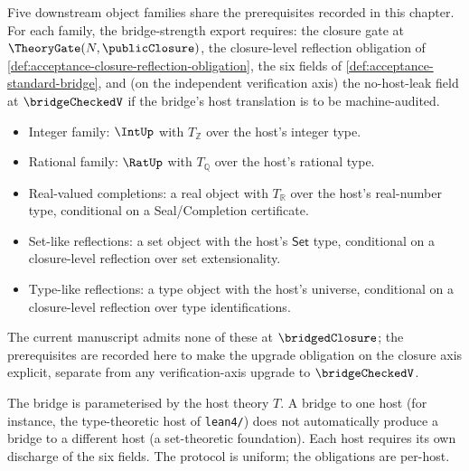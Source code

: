 \begin{remark}
\label{rem:acceptance-bridge-common-prereqs}
Five downstream object families share the prerequisites recorded in this chapter. For each family, the bridge-strength export requires: the closure gate at $\TheoryGate(N, \publicClosure)$, the closure-level reflection obligation of \autoref{def:acceptance-closure-reflection-obligation}, the six fields of \autoref{def:acceptance-standard-bridge}, and (on the independent verification axis) the no-host-leak field at $\bridgeCheckedV$ if the bridge's host translation is to be machine-audited.
\begin{itemize}
  \item Integer family: $\IntUp$ with $T_{\mathbb{Z}}$ over the host's integer type.
  \item Rational family: $\RatUp$ with $T_{\mathbb{Q}}$ over the host's rational type.
  \item Real-valued completions: a real object with $T_{\mathbb{R}}$ over the host's real-number type, conditional on a Seal/Completion certificate.
  \item Set-like reflections: a set object with the host's $\mathsf{Set}$ type, conditional on a closure-level reflection over set extensionality.
  \item Type-like reflections: a type object with the host's universe, conditional on a closure-level reflection over type identifications.
\end{itemize}
The current manuscript admits none of these at $\bridgedClosure$; the prerequisites are recorded here to make the upgrade obligation on the closure axis explicit, separate from any verification-axis upgrade to $\bridgeCheckedV$.
\end{remark}

\begin{remark}
\label{rem:acceptance-bridge-per-host}
The bridge is parameterised by the host theory $T$. A bridge to one host (for instance, the type-theoretic host of \texttt{lean4/}) does not automatically produce a bridge to a different host (a set-theoretic foundation). Each host requires its own discharge of the six fields. The protocol is uniform; the obligations are per-host.
\end{remark}
